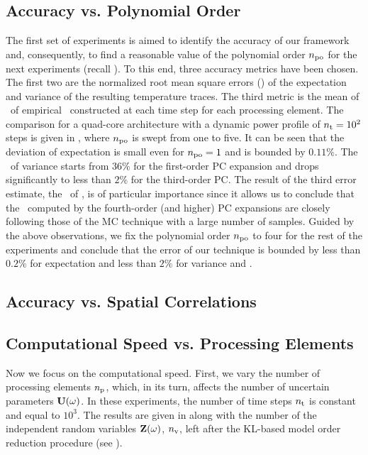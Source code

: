 \subsection{Accuracy vs. Polynomial Order}

The first set of experiments is aimed to identify the accuracy of our framework and, consequently, to find a reasonable value of the polynomial order ${n_\text{po}}$ for the next experiments (recall ).
To this end, three accuracy metrics have been chosen.
The first two are the normalized root mean square errors (\nrmses) of the expectation and variance of the resulting temperature traces.
The third metric is the mean of \nrmses\ of empirical \pdfs\ constructed at each time step for each processing element.
The comparison for a quad-core architecture with a dynamic power profile of ${n_\text{t}} = 10^2$ steps is given in , where ${n_\text{po}}$ is swept from one to five.
It can be seen that the deviation of expectation is small even for ${n_\text{po}} = 1$ and is bounded by $0.11\%$.
The \nrmse\ of variance starts from $36\%$ for the first-order PC expansion and drops significantly to less than $2\%$ for the third-order PC.
The result of the third error estimate, the \nrmses\ of \pdfs, is of particular importance since it allows us to conclude that the \pdfs\ computed by the fourth-order (and higher) PC expansions are closely following those of the MC technique with a large number of samples.
Guided by the above observations, we fix the polynomial order ${n_\text{po}}$ to four for the rest of the experiments and conclude that the error of our technique is bounded by less than $0.2\%$ for expectation and less than $2\%$ for variance and \pdf.

\subsection{Accuracy vs. Spatial Correlations}

\subsection{Computational Speed vs. Processing Elements}
Now we focus on the computational speed.
First, we vary the number of processing elements ${n_\text{p}}$, which, in its turn, affects the number of uncertain parameters $\mathbf{U}(\omega)$.
In these experiments, the number of time steps ${n_\text{t}}$ is constant and equal to $10^3$.
The results are given in  along with the number of the independent random variables $\mathbf{Z}(\omega)$, ${n_\text{v}}$, left after the KL-based model order reduction procedure (see ).


